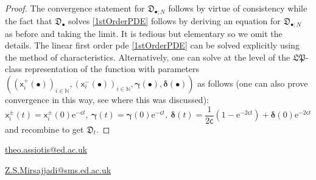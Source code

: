 \documentclass[]{article}
\begin{document}
\begin{proof}
The convergence statement for $\mathfrak{D}_{\bullet;N}$ follows by virtue of consistency while the fact that $\mathfrak{D}_{\bullet}$ solves \eqref{1stOrderPDE} follows by deriving an equation for $\mathfrak{D}_{\bullet;N}$ as before and taking the limit. It is tedious but elementary so we omit the details. The linear first order pde \eqref{1stOrderPDE} can be solved explicitly using the method of characteristics. Alternatively,  one can solve at the level of the $\mathfrak{LP}$-class representation of the function with parameters $((\mathsf{x}_i^+(\bullet))_{i\in \mathbb{N}},(\mathsf{x}_i^-(\bullet))_{i\in \mathbb{N}},\boldsymbol{\gamma}(\bullet),\boldsymbol{\delta}(\bullet))$ as follows (one can also prove convergence in this way, see \cite{HuaPickrellDiffusions} where this was discussed):
\begin{equation*}
\mathsf{x}_i^{\pm}(t)=\mathsf{x}^\pm_i(0)\mathrm{e}^{-\mathsf{c}t}, \ \boldsymbol{\gamma}(t)=\boldsymbol{\gamma}(0)\mathrm{e}^{-\mathsf{c}t}, \ \boldsymbol{\delta}(t)=\frac{1}{2\mathsf{c}}\left(1-\mathrm{e}^{-2\mathsf{c}t}\right)+\boldsymbol{\delta}(0)\mathrm{e}^{-2\mathsf{c}t}
\end{equation*}
and recombine to get $\mathfrak{D}_t$.
\end{proof}






















































\bigskip 

\newline
\href{mailto:theo.assiotis@ed.ac.uk}{\small theo.assiotis@ed.ac.uk}

\bigskip

\newline
\href{mailto:Z.S.Mirsajjadi@sms.ed.ac.uk}{\small Z.S.Mirsajjadi@sms.ed.ac.uk}
\end{document}
